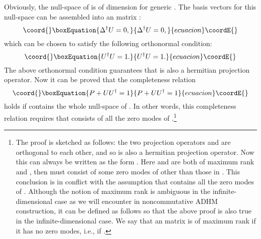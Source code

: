 \documentclass[a4paper,a4paper]{article}
\begin{document}
Obviously, the null-space of \coordHE{} is of \coordHE{}
dimension for generic \coordHE{}. The basis vectors for this null-space
can be assembled into an \coordHE{} matrix \coordHE{}:
\begin{equation}\coord{}\boxEquation{
\Delta^\dag U=0,
}{
\Delta^\dag U=0,
}{ecuacion}\coordE{}\end{equation}
which can be chosen to satisfy the following orthonormal
condition:
\begin{equation}\coord{}\boxEquation{
\label{normal} U^\dag U=1.
}{
U^\dag U=1.
}{ecuacion}\coordE{}\end{equation}
The above orthonormal condition guarantees that \coordHE{} is also
a hermitian projection operator. Now it can be proved that the
completeness relation \cite{Paperb}
\begin{equation}\coord{}\boxEquation{
\label{complete} P+UU^\dag=1
}{
P+UU^\dag=1
}{ecuacion}\coordE{}\end{equation}
holds if \coordHE{} contains the whole null-space of \myHighlight{$\Delta^\dagger$}\coordHE{}. In
other words, this completeness relation requires that \coordHE{} consists
of all the zero modes of \myHighlight{$\Delta^\dagger$}\coordHE{}.\footnote{The proof is
sketched as follows: the two projection operators \coordHE{} and
\coordHE{} are orthogonal to each other, and so \coordHE{} is
also a hermitian projection operator. Now this can always be
written as the form \coordHE{}. Here \myHighlight{$\Delta$}\coordHE{} and \coordHE{} are both of
maximum rank and \coordHE{}, then \coordHE{} must consist of some zero
modes of \myHighlight{$\Delta^\dagger$}\coordHE{} other than those in \coordHE{}. This conclusion
is in conflict with the assumption that \coordHE{} contains all the zero
modes of \myHighlight{$\Delta^\dagger$}\coordHE{}. Although the notion of maximum rank is
ambiguous in the infinite-dimensional case as we will encounter in
noncommutative ADHM construction, it can be defined as follows so
that the above proof is also true in the infinite-dimensional
case. We say that an \myHighlight{$\infty\times\infty$}\coordHE{} matrix \coordHE{} is of maximum
rank if it has no zero modes, i.e., \coordHE{} if \coordHE{}.}
\end{document}
